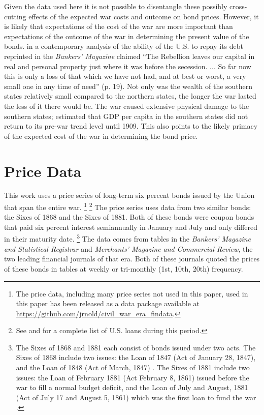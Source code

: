 \documentclass[11pt, oneside, article]{memoir}
\begin{document}
Given the data used here it is not possible to disentangle these possibly cross-cutting effects of the expected war costs and outcome on bond prices.
However, it is likely that expectations of the cost of the war are more important than expectations of the outcome of the war in determining the present value of the bonds.
\textcite{elder1863debt} in a contemporary analysis of the ability of the U.S. to repay its debt reprinted in the \textit{Bankers' Magazine} claimed ``The Rebellion leaves our capital in real and personal property just where it was before the secession. ... So far now this is only a loss of that which we have not had, and at best or worst, a very small one in any time of need'' (p. 19).
Not only was the wealth of the southern states relatively small compared to the northern states, the longer the war lasted the less of it there would be.
The war caused extensive physical damage to the southern states; \textcite{GoldinLewis1975} estimated that GDP per capita in the southern states did not return to its pre-war trend level until 1909.
This also points to the likely primacy of the expected cost of the war in determining the bond price.

\section{Price Data}
\label{sec:price-data}

This work uses a price series of long-term six percent bonds issued by the Union that span the entire war.%
\footnote{
  The price data, including many price series not used in this paper,  used in this paper has been released as a data package available at \url{https://github.com/jrnold/civil_war_era_findata}.
}%
\footnote{
  See \textcite{ustreasury1900} and \textcite{united1882national} for a complete list of U.S. loans during this period.
}
The price series uses data from two similar bonds: the Sixes of 1868 and the Sixes of 1881.%
Both of these bonds were coupon bonds that paid six percent interest semiannually in January and July and only differed in their maturity date.%
\footnote{
  The Sixes of 1868 and 1881 each consist of bonds issued under two acts.
  The Sixes of 1868 include two issues: the Loan of 1847 (Act of January 28, 1847), and the Loan of 1848 (Act of March, 1847) \parencites[72-73,145-148]{united1882national}[72-74]{ustreasury1900}.
  The Sixes of 1881 include two issues: the Loan of February 1881 (Act February 8, 1861) issued before the war to fill a normal budget deficit, and the Loan of July and August, 1881 (Act of July 17 and August 5, 1861) which was the first loan to fund the war \parencites[81]{united1882national}[78-79,81-82,151-153]{ustreasury1900}.
}
The data comes from tables in the \textit{Bankers' Magazine and Statistical Registrar} and \textit{Merchants' Magazine and Commercial Review}, the two leading financial journals of that era.
Both of these journals quoted the prices of these bonds in tables at weekly or tri-monthly (1st, 10th, 20th) frequency.
\end{document}
